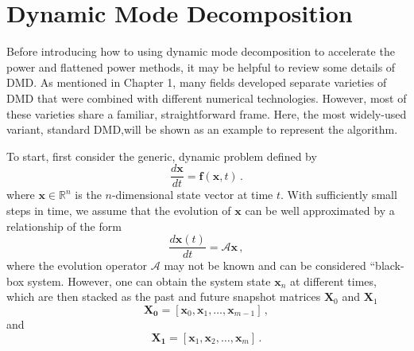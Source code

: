\cleardoublepage

\chapter{Dynamic Mode Decomposition}
\label{chapter:DMD-PM}

Before introducing how to using dynamic mode decomposition to accelerate the power and flattened power methods, it may be helpful to review some details of DMD.
As mentioned in Chapter 1, many fields developed separate varieties of DMD that were combined with different numerical technologies.
However, most of these varieties share a familiar, straightforward frame. 
Here, the most widely-used variant, standard DMD,will be shown as an example to represent the algorithm.

To start, first consider the generic, dynamic problem defined by 
\begin{equation}
  \frac{d{\mathbf{x}}}{dt}=\mathbf{f}(\mathbf{x},t) \, .
  \label{eq:dynamic_problem}
\end{equation}
where $\mathbf{x} \in \mathbb{R}^{n}$ is the $n$-dimensional state vector at time $t$. 
With sufficiently small steps in time, we assume that the evolution of  $\mathbf{x}$ can be well approximated by a relationship of the form 
\begin{equation}
 \frac{d{\mathbf{x}}(t)}{dt}=\mathcal{A}\mathbf{x} \, ,
 \label{eq:linearized_model}
\end{equation}
where the evolution operator $\mathcal{A}$ may not be known and can be considered ``black-box system.
However, one can obtain the system state $\mathbf{x}_n$ at different times, which are then stacked as the past and future snapshot matrices $ \mathbf{X}_0$ and $ \mathbf{X}_1$ 
\begin{equation}
\label{eq:past_data}
\mathbf{X_0}=\left[ \mathbf{x}_0, \mathbf{x}_1, \ldots, \mathbf{x}_{m-1} \right] \, ,
\end{equation}
and
\begin{equation}
\label{eq:future_data}
\mathbf{X_1}=\left[ \mathbf{x}_1, \mathbf{x}_2, \ldots, \mathbf{x}_{m} \right] \, .
\end{equation}

